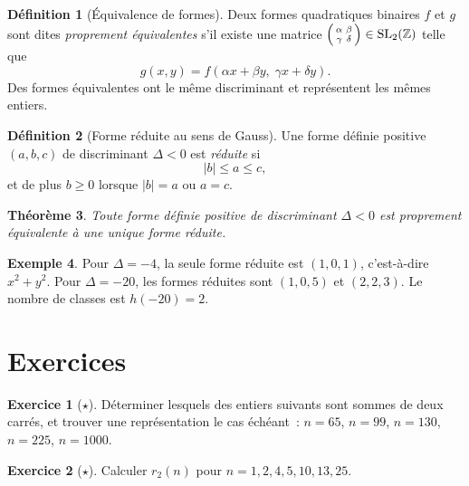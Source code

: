 \documentclass[12pt,a4paper,openany]{book}
\theoremstyle{definition}
\newtheorem{definition}{Définition}[chapter]
\newtheorem{exemple}[definition]{Exemple}
\newtheorem{exercice}{Exercice}[chapter]
\theoremstyle{plain}
\newtheorem{theoreme}[definition]{Théorème}
\theoremstyle{remark}
\newcommand{\Z}{\mathbb{Z}}
\newcommand{\abs}[1]{\left|#1\right|}
\begin{document}
\begin{definition}[Équivalence de formes]
\label{def:equivalence-formes}
Deux formes quadratiques binaires $f$ et $g$ sont dites \emph{proprement équivalentes}
s'il existe une matrice $\begin{psmallmatrix} \alpha & \beta \\ \gamma & \delta
\end{psmallmatrix} \in \mathrm{SL}_2(\Z)$ telle que
\[
  g(x,y) = f(\alpha x + \beta y,\; \gamma x + \delta y).
\]
Des formes équivalentes ont le même discriminant et représentent les mêmes entiers.
\end{definition}

\begin{definition}[Forme réduite au sens de Gauss]
\label{def:forme-reduite}
Une forme définie positive $(a,b,c)$ de discriminant $\Delta < 0$ est \emph{réduite} si
\[
  \abs{b} \leq a \leq c,
\]
et de plus $b \geq 0$ lorsque $\abs{b} = a$ ou $a = c$.
\end{definition}

\begin{theoreme}
\label{thm:unicite-forme-reduite}
Toute forme définie positive de discriminant $\Delta < 0$ est proprement équivalente à
une unique forme réduite.
\end{theoreme}

\begin{exemple}
\label{ex:formes-reduites}
Pour $\Delta = -4$, la seule forme réduite est $(1, 0, 1)$, c'est-à-dire $x^2 + y^2$.
Pour $\Delta = -20$, les formes réduites sont $(1, 0, 5)$ et $(2, 2, 3)$. Le
nombre de classes est $h(-20) = 2$.
\end{exemple}

\section{Exercices}
\label{sec:exos-ch7}

\begin{exercice}[$\star$]
\label{exo:sommes-deux-carres-1}
Déterminer lesquels des entiers suivants sont sommes de deux carrés, et trouver une
représentation le cas échéant~: $n = 65$, $n = 99$, $n = 130$, $n = 225$, $n = 1000$.
\end{exercice}

\begin{exercice}[$\star$]
\label{exo:r2-calcul}
Calculer $r_2(n)$ pour $n = 1, 2, 4, 5, 10, 13, 25$.
\end{exercice}
\end{document}
